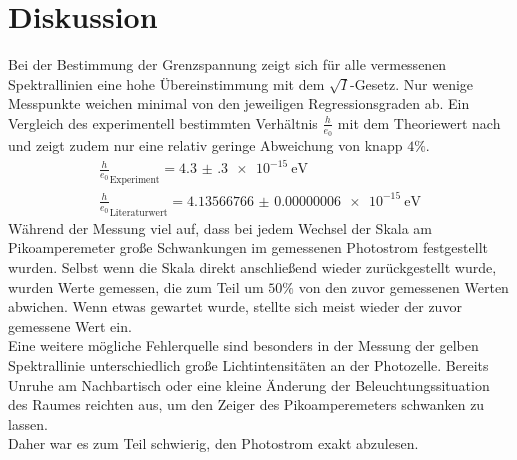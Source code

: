 \section{Diskussion}
\label{sec:Diskussion}
Bei der Bestimmung der Grenzspannung zeigt sich für alle vermessenen Spektrallinien eine hohe Übereinstimmung mit dem $\sqrt{I}$-Gesetz. Nur wenige Messpunkte weichen minimal von den jeweiligen Regressionsgraden ab.
Ein Vergleich des experimentell bestimmten Verhältnis $\frac{h}{e_0}$ mit dem Theoriewert nach \cite{h} und \cite{e} zeigt zudem nur eine relativ geringe Abweichung von knapp $4\%$.
\begin{gather*}
  {\frac{h}{e_0}}_\mathrm{Experiment}=\SI{4.3(3)e-15}{\electronvolt}\\
  {\frac{h}{e_0}}_\mathrm{Literaturwert}=\SI{4.13566766(6)e-15}{\electronvolt}
\end{gather*}
Während der Messung viel auf, dass bei jedem Wechsel der Skala am Pikoamperemeter große Schwankungen im gemessenen Photostrom festgestellt wurden. Selbst wenn die Skala direkt anschließend wieder zurückgestellt wurde, wurden Werte gemessen, die zum Teil um $50\%$ von den zuvor gemessenen Werten abwichen. Wenn etwas gewartet wurde, stellte sich meist wieder der zuvor gemessene Wert ein.\\
Eine weitere mögliche Fehlerquelle sind besonders in der Messung der gelben Spektrallinie unterschiedlich große Lichtintensitäten an der Photozelle. Bereits Unruhe am Nachbartisch oder eine kleine Änderung der Beleuchtungssituation des Raumes reichten aus, um den Zeiger des Pikoamperemeters schwanken zu lassen.\\
Daher war es zum Teil schwierig, den Photostrom exakt abzulesen.
